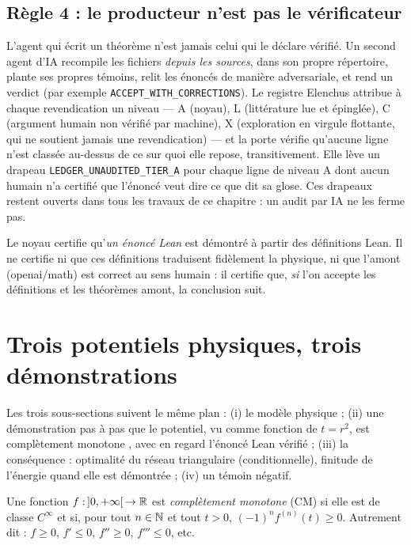\subsection{Règle 4 : le producteur n'est pas le vérificateur}\label{ch2:ssec:prodverif}
L'agent qui écrit un théorème n'est jamais celui qui le déclare vérifié. Un second agent d'IA recompile les fichiers
\emph{depuis les sources}, dans son propre répertoire, plante ses propres témoins, relit les énoncés de manière
adversariale, et rend un verdict (par exemple \texttt{ACCEPT\_WITH\_CORRECTIONS}). Le registre Elenchus attribue à chaque
revendication un niveau --- A (noyau), L (littérature lue et épinglée), C (argument humain non vérifié par machine),
X (exploration en virgule flottante, qui ne soutient jamais une revendication) --- et la porte vérifie qu'aucune ligne
n'est classée au-dessus de ce sur quoi elle repose, transitivement. Elle lève un drapeau
\texttt{LEDGER\_UNAUDITED\_TIER\_A} pour chaque ligne de niveau A dont aucun humain n'a certifié que l'énoncé veut dire ce
que dit sa glose. Ces drapeaux restent ouverts dans tous les travaux de ce chapitre : un audit par IA ne les ferme pas.

\begin{warnbox}
Le noyau certifie qu'\emph{un énoncé Lean} est démontré à partir des définitions Lean. Il ne certifie ni que ces
définitions traduisent fidèlement la physique, ni que l'amont (openai/math) est correct au sens humain : il certifie
que, \emph{si} l'on accepte les définitions et les théorèmes amont, la conclusion suit.
\end{warnbox}

\section{Trois potentiels physiques, trois démonstrations}\label{ch2:sec:pot}

Les trois sous-sections suivent le même plan : (i) le modèle physique \tierC{} ; (ii) une démonstration pas à pas que
le potentiel, vu comme fonction de $t=r^2$, est complètement monotone \tierC{}, avec en regard l'énoncé Lean vérifié
\tierA{} ; (iii) la conséquence : optimalité du réseau triangulaire (conditionnelle), finitude de l'énergie quand elle
est démontrée ; (iv) un témoin négatif.

\begin{definition}\label{ch2:def:cm}
Une fonction $f:\,]0,+\infty[\,\to\mathbb{R}$ est \emph{complètement monotone} (CM) si elle est de classe $C^\infty$ et si, pour
tout $n\in\mathbb{N}$ et tout $t>0$, $(-1)^nf^{(n)}(t)\ge0$. Autrement dit : $f\ge0$, $f'\le0$, $f''\ge0$, $f'''\le0$, etc.
\end{definition}

